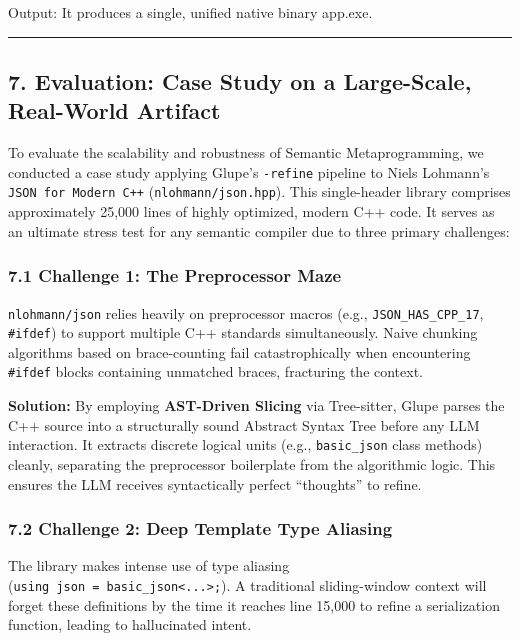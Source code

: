 \documentclass[11pt, a4paper]{article}
\begin{document}
Output: It produces a single, unified native binary app.exe.

\begin{center}\rule{0.5\linewidth}{0.5pt}\end{center}

\subsection{7. Evaluation: Case Study on a Large-Scale, Real-World
Artifact}\label{evaluation-case-study-on-a-large-scale-real-world-artifact}

To evaluate the scalability and robustness of Semantic Metaprogramming,
we conducted a case study applying Glupe's \texttt{-refine} pipeline to
Niels Lohmann's \texttt{JSON\ for\ Modern\ C++}
(\texttt{nlohmann/json.hpp}). This single-header library comprises
approximately 25,000 lines of highly optimized, modern C++ code. It
serves as an ultimate stress test for any semantic compiler due to three
primary challenges:

\subsubsection{7.1 Challenge 1: The Preprocessor
Maze}\label{challenge-1-the-preprocessor-maze}

\texttt{nlohmann/json} relies heavily on preprocessor macros (e.g.,
\texttt{JSON\_HAS\_CPP\_17}, \texttt{\#ifdef}) to support multiple C++
standards simultaneously. Naive chunking algorithms based on
brace-counting fail catastrophically when encountering \texttt{\#ifdef}
blocks containing unmatched braces, fracturing the context.

\textbf{Solution:} By employing \textbf{AST-Driven Slicing} via
Tree-sitter, Glupe parses the C++ source into a structurally sound
Abstract Syntax Tree before any LLM interaction. It extracts discrete
logical units (e.g., \texttt{basic\_json} class methods) cleanly,
separating the preprocessor boilerplate from the algorithmic logic. This
ensures the LLM receives syntactically perfect ``thoughts'' to refine.

\subsubsection{7.2 Challenge 2: Deep Template Type
Aliasing}\label{challenge-2-deep-template-type-aliasing}

The library makes intense use of type aliasing
(\texttt{using\ json\ =\ basic\_json\textless{}...\textgreater{};}). A
traditional sliding-window context will forget these definitions by the
time it reaches line 15,000 to refine a serialization function, leading
to hallucinated intent.
\end{document}

